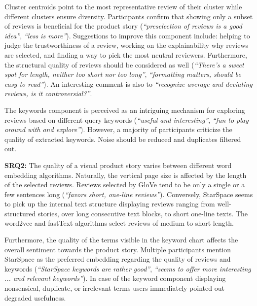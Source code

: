 Cluster centroids point to the most representative review of their cluster while different clusters ensure diversity.
Participants confirm that showing only a subset of reviews is beneficial for the product story (\emph{``preselection of reviews is a good idea''}, \emph{``less is more''}).
Suggestions to improve this component include: helping to judge the trustworthiness of a review, working on the explainability why reviews are selected, and finding a way to pick the most neutral reviewers.
Furthermore, the structural quality of reviews should be considered as well (\emph{``There's a sweet spot for length, neither too short nor too long''}, \emph{``formatting matters, should be easy to read''}).
An interesting comment is also to \emph{``recognize average and deviating reviews, is it controversial?''}.

The keywords component is perceived as an intriguing mechanism for exploring reviews based on different query keywords (\emph{``useful and interesting''}, \emph{``fun to play around with and explore''}).
However, a majority of participants criticize the quality of extracted keywords.
Noise should be reduced and duplicates filtered out.

\hfill

\noindent
\textbf{SRQ2:} The quality of a visual product story varies between different word embedding algorithms.
Naturally, the vertical page size is affected by the length of the selected reviews.
Reviews selected by GloVe tend to be only a single or a few sentences long (\emph{``favors short, one-line reviews''}).
Conversely, StarSpace seems to pick up the internal text structure displaying reviews ranging from well-structured stories, over long consecutive text blocks, to short one-line texts.
The word2vec and fastText algorithms select reviews of medium to short length.

Furthermore, the quality of the terms visible in the keyword chart affects the overall sentiment towards the product story.
Multiple participants mention StarSpace as the preferred embedding regarding the quality of reviews and keywords (\emph{``StarSpace keywords are rather good''}, \emph{``seems to offer more interesting ... and relevant keywords''}).
In case of the keyword component displaying nonsensical, duplicate, or irrelevant terms users immediately pointed out degraded usefulness.

\hfill

